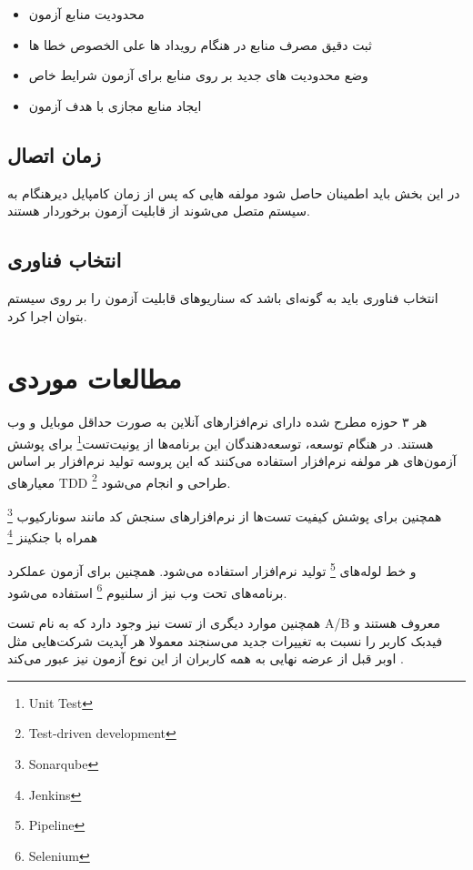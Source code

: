 \begin{itemize}
\item
محدودیت منابع آزمون
\item
ثبت دقیق مصرف منابع در هنگام رویداد ها علی الخصوص خطا ها
\item
وضع محدودیت های جدید بر روی منابع برای آزمون شرایط خاص
\item
ایجاد منابع مجازی با هدف آزمون
\end{itemize}
\subsection{زمان اتصال}
در این بخش باید اطمینان حاصل شود مولفه هایی که پس از زمان کامپایل دیرهنگام به سیستم متصل می‌شوند از قابلیت آزمون برخوردار هستند.
\subsection{انتخاب فناوری}
انتخاب فناوری باید به گونه‌ای باشد که سناریو‌های قابلیت آزمون را بر روی سیستم بتوان اجرا کرد.



\section{مطالعات موردی}
هر ۳ حوزه مطرح شده دارای نرم‌افزارهای آنلاین به صورت حداقل موبایل و وب هستند. در هنگام توسعه، توسعه‌دهندگان این برنامه‌ها از یونیت‌تست\footnote{Unit Test}
برای پوشش آزمون‌های هر مولفه نرم‌افزار استفاده می‌کنند که این پروسه تولید نرم‌افزار بر اساس معیارهای TDD \footnote{Test-driven development} طراحی و انجام می‌شود.

همچنین برای پوشش کیفیت تست‌ها از نرم‌افزارهای سنجش کد مانند سونارکیوب
\footnote{Sonarqube}
همراه با جنکینز
\footnote{Jenkins} 

و خط لوله‌های
\footnote{Pipeline}
تولید نرم‌افزار استفاده می‌شود.
همچنین برای آزمون عملکرد برنامه‌های تحت وب نیز از سلنیوم 
\footnote{Selenium}
استفاده می‌شود.

همچنین موارد دیگری از تست نیز وجود دارد که به نام تست A/B معروف هستند و فیدبک کاربر را نسبت به تغییرات جدید می‌سنجند معمولا هر آپدیت شرکت‌هایی مثل اوبر قبل از عرضه نهایی به همه کاربران از این نوع آزمون نیز عبور می‌کند \cite{uber_test}.